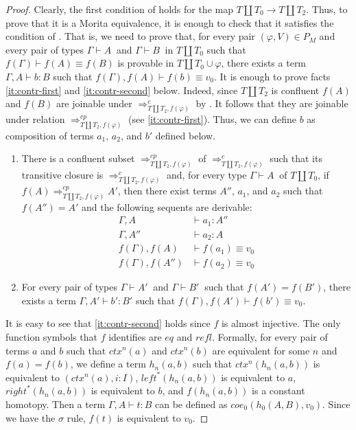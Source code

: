 \documentclass[reqno]{amsart}
\theoremstyle{definition}
\theoremstyle{remark}
\newcommand{\deq}{\equiv}
\newcommand{\type}{}
\newcommand{\Ceq}{\mathit{eq}}
\newcommand{\leftI}{\mathit{left}}
\newcommand{\rightI}{\mathit{right}}
\newcommand{\coe}{\mathit{coe}}
\newcommand{\refl}{\mathit{refl}}
\newcommand{\ctx}{\mathit{ctx}}
\numberwithin{figure}{section}
\begin{document}
\begin{proof}
Clearly, the first condition of  holds for the map $T \amalg T_0 \to T \amalg T_2$.
Thus, to prove that it is a Morita equivalence, it is enough to check that it satisfies the condition of .
That is, we need to prove that, for every pair $(\varphi,V) \in P_M$ and every pair of types $\Gamma \vdash A\ \type$ and $\Gamma \vdash B\ \type$ in $T \amalg T_0$ such that $f(\Gamma) \vdash f(A) \deq f(B)$ is provable in $T \amalg T_0 \cup \varphi$,
there exists a term $\Gamma, A \vdash b : B$ such that $f(\Gamma), f(A) \vdash f(b) \deq v_0$.
It is enough to prove facts \eqref{it:contr-first} and \eqref{it:contr-second} below.
Indeed, since $T \amalg T_2$ is confluent $f(A)$ and $f(B)$ are joinable under $\Rightarrow_{T \amalg T_2, f(\varphi)}^c$ by .
It follows that they are joinable under relation $\Rightarrow_{T \amalg T_2, f(\varphi)}^{cp}$ (see \eqref{it:contr-first}).
Thus, we can define $b$ as composition of terms $a_1$, $a_2$, and $b'$ defined below.
\begin{enumerate}
\item \label{it:contr-first} There is a confluent subset $\Rightarrow_{T \amalg T_2, f(\varphi)}^{cp}$ of $\Rightarrow_{T \amalg T_2, f(\varphi)}^c$ such that its transitive closure is $\Rightarrow_{T \amalg T_2, f(\varphi)}^c$ and,
for every type $\Gamma \vdash A\ \type$ of $T \amalg T_0$, if $f(A) \Rightarrow_{T \amalg T_2, f(\varphi)}^{cp} A'$, then there exist terms $A''$, $a_1$, and $a_2$ such that $f(A'') = A'$ and the following sequents are derivable:
\begin{align*}
\Gamma, A & \vdash a_1 : A'' \\
\Gamma, A'' & \vdash a_2 : A \\
f(\Gamma), f(A) & \vdash f(a_1) \deq v_0 \\
f(\Gamma), f(A'') & \vdash f(a_2) \deq v_0
\end{align*}
\item \label{it:contr-second} For every pair of types $\Gamma \vdash A'\ \type$ and $\Gamma \vdash B'\ \type$ such that $f(A') = f(B')$, there exists a term $\Gamma, A' \vdash b' : B'$ such that $f(\Gamma), f(A') \vdash f(b') \deq v_0$.
\end{enumerate}

It is easy to see that \eqref{it:contr-second} holds since $f$ is almost injective.
The only function symbols that $f$ identifies are $\Ceq$ and $\refl$.
Formally, for every pair of terms $a$ and $b$ such that $\ctx^n(a)$ and $\ctx^n(b)$ are equivalent for some $n$ and $f(a) = f(b)$, 
we define a term $h_n(a,b)$ such that $\ctx^n(h_n(a,b))$ is equivalent to $(\ctx^n(a), i : I)$, $\leftI^*(h_n(a,b))$ is equivalent to $a$, $\rightI^*(h_n(a,b))$ is equivalent to $b$, and $f(h_n(a,b))$ is a constant homotopy.
Then a term $\Gamma, A \vdash t : B$ can be defined as $\coe_0(h_0(A,B), v_0)$.
Since we have the $\sigma$ rule, $f(t)$ is equivalent to $v_0$.


\end{proof}
\end{document}
